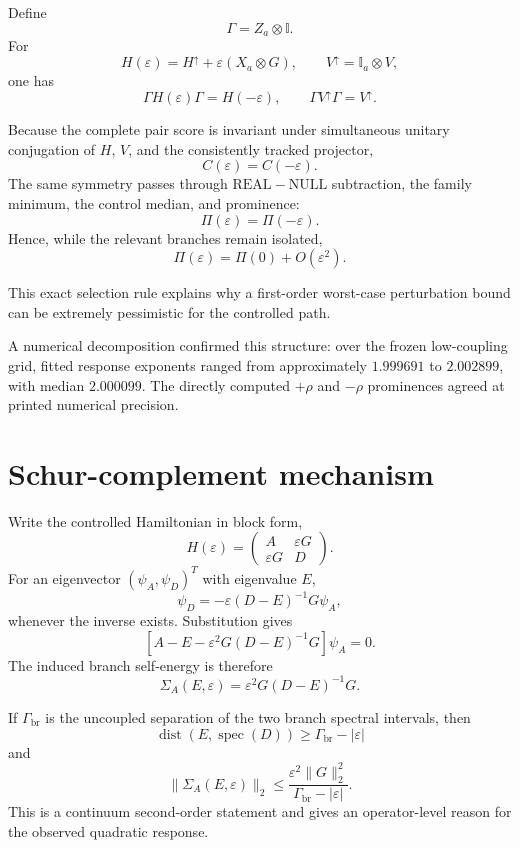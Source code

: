 \documentclass[11pt,a4paper]{article}
\newcommand{\Real}{\mathrm{REAL}}
\newcommand{\Null}{\mathrm{NULL}}
\newcommand{\Id}{\mathbb I}
\newcommand{\eps}{\varepsilon}
\newcommand{\Prom}{\Pi}
\newcommand{\dist}{\operatorname{dist}}
\newcommand{\spec}{\operatorname{spec}}
\begin{document}
Define
\[
\Gamma=Z_a\otimes\Id.
\]
For
\[
H(\eps)=H^\uparrow+\eps(X_a\otimes G),
\qquad
V^\uparrow=\Id_a\otimes V,
\]
one has
\[
\Gamma H(\eps)\Gamma=H(-\eps),
\qquad
\Gamma V^\uparrow\Gamma=V^\uparrow.
\]

Because the complete pair score is invariant under simultaneous unitary
conjugation of \(H\), \(V\), and the consistently tracked projector,
\[
C(\eps)=C(-\eps).
\]
The same symmetry passes through \(\Real-\Null\) subtraction, the family
minimum, the control median, and prominence:
\[
\boxed{
\Prom(\eps)=\Prom(-\eps).
}
\]
Hence, while the relevant branches remain isolated,
\[
\boxed{
\Prom(\eps)=\Prom(0)+O(\eps^2).
}
\]

This exact selection rule explains why a first-order worst-case perturbation
bound can be extremely pessimistic for the controlled path.

A numerical decomposition confirmed this structure: over the frozen
low-coupling grid, fitted response exponents ranged from approximately
\(1.999691\) to \(2.002899\), with median \(2.000099\).  The directly computed
\(+\rho\) and \(-\rho\) prominences agreed at printed numerical precision.

\section{Schur-complement mechanism}

Write the controlled Hamiltonian in block form,
\[
H(\eps)
=
\begin{pmatrix}
A & \eps G\\
\eps G & D
\end{pmatrix}.
\]
For an eigenvector \((\psi_A,\psi_D)^T\) with eigenvalue \(E\),
\[
\psi_D
=
-\eps(D-E)^{-1}G\psi_A,
\]
whenever the inverse exists.  Substitution gives
\[
\left[
A-E-\eps^2G(D-E)^{-1}G
\right]\psi_A=0.
\]
The induced branch self-energy is therefore
\[
\boxed{
\Sigma_A(E,\eps)
=
\eps^2G(D-E)^{-1}G.
}
\]

If \(\Gamma_{\mathrm{br}}\) is the uncoupled separation of the two branch
spectral intervals, then
\[
\dist(E,\spec(D))
\ge
\Gamma_{\mathrm{br}}-|\eps|
\]
and
\[
\boxed{
\|\Sigma_A(E,\eps)\|_2
\le
\frac{\eps^2\|G\|_2^2}{
\Gamma_{\mathrm{br}}-|\eps|
}.
}
\]
This is a continuum second-order statement and gives an operator-level reason
for the observed quadratic response.

\end{document}
